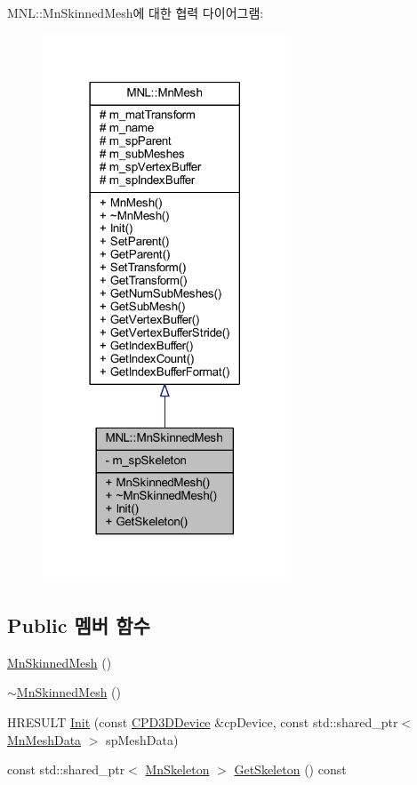 M\+NL\+:\+:Mn\+Skinned\+Mesh에 대한 협력 다이어그램\+:\nopagebreak
\begin{figure}[H]
\begin{center}
\leavevmode
\includegraphics[width=206pt]{class_m_n_l_1_1_mn_skinned_mesh__coll__graph}
\end{center}
\end{figure}
\subsection*{Public 멤버 함수}
\begin{DoxyCompactItemize}
\item 
\hyperlink{class_m_n_l_1_1_mn_skinned_mesh_a4fa48c8717084c6b531904b03218a53a}{Mn\+Skinned\+Mesh} ()
\item 
\hyperlink{class_m_n_l_1_1_mn_skinned_mesh_a02d5a7d9417239ca70275166acba5756}{$\sim$\+Mn\+Skinned\+Mesh} ()
\item 
H\+R\+E\+S\+U\+LT \hyperlink{class_m_n_l_1_1_mn_skinned_mesh_ad212179142cda2c4a722b58ab19a739e}{Init} (const \hyperlink{namespace_m_n_l_a1eec210db8f309a4a9ac0d9658784c31}{C\+P\+D3\+D\+Device} \&cp\+Device, const std\+::shared\+\_\+ptr$<$ \hyperlink{class_m_n_l_1_1_mn_mesh_data}{Mn\+Mesh\+Data} $>$ sp\+Mesh\+Data)
\item 
const std\+::shared\+\_\+ptr$<$ \hyperlink{class_m_n_l_1_1_mn_skeleton}{Mn\+Skeleton} $>$ \hyperlink{class_m_n_l_1_1_mn_skinned_mesh_af1a7817424b8bed1d381fdf82b06a312}{Get\+Skeleton} () const
\end{DoxyCompactItemize}
